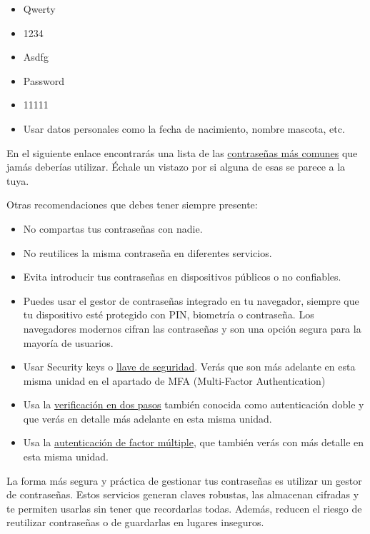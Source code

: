 \documentclass[
  spanish,
  a4paper,
  openany]{book}
\begin{document}
\begin{itemize}
\item
  Qwerty
\item
  1234
\item
  Asdfg
\item
  Password
\item
  11111
\item
  Usar datos personales como la fecha de nacimiento, nombre mascota, etc.
\end{itemize}

En el siguiente enlace encontrarás una lista de las \href{https://nordpass.com/most-common-passwords-list/}{contraseñas más comunes} que jamás deberías utilizar. Échale un vistazo por si alguna de esas se parece a la tuya.

Otras recomendaciones que debes tener siempre presente:

\begin{itemize}
\item
  No compartas tus contraseñas con nadie.
\item
  No reutilices la misma contraseña en diferentes servicios.
\item
  Evita introducir tus contraseñas en dispositivos públicos o no confiables.
\item
  Puedes usar el gestor de contraseñas integrado en tu navegador, siempre que tu dispositivo esté protegido con PIN, biometría o contraseña. Los navegadores modernos cifran las contraseñas y son una opción segura para la mayoría de usuarios.
\item
  Usar Security keys o \href{https://es.digitaltrends.com/computadoras/las-mejores-llaves-de-seguridad-usb/}{llave de seguridad}. Verás que son más adelante en esta misma unidad en el apartado de MFA (Multi-Factor Authentication)
\item
  Usa la \href{https://www.bbva.es/finanzas-vistazo/ciberseguridad/seguridad-en-internet/verificacion-en-dos-pasos.html}{verificación en dos pasos} también conocida como autenticación doble y que verás en detalle más adelante en esta misma unidad.
\item
  Usa la \href{https://www.osi.es/es/actualidad/blog/2019/02/27/el-factor-de-autenticacion-doble-y-multiple}{autenticación de factor múltiple}, que también verás con más detalle en esta misma unidad.
\end{itemize}

La forma más segura y práctica de gestionar tus contraseñas es utilizar un gestor de contraseñas. Estos servicios generan claves robustas, las almacenan cifradas y te permiten usarlas sin tener que recordarlas todas. Además, reducen el riesgo de reutilizar contraseñas o de guardarlas en lugares inseguros.
\end{document}
